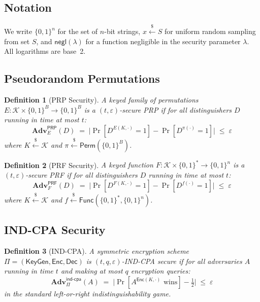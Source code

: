 \documentclass[11pt]{article}
\newtheorem{definition}{Definition}
\newcommand{\Enc}{\textsf{Enc}}
\newcommand{\Dec}{\textsf{Dec}}
\newcommand{\KeyGen}{\textsf{KeyGen}}
\newcommand{\PRF}{\textsf{PRF}}
\newcommand{\PRP}{\textsf{PRP}}
\newcommand{\Adv}{\mathbf{Adv}}
\newcommand{\negl}{\textsf{negl}}
\newcommand{\getsr}{\stackrel{\$}{\leftarrow}}
\begin{document}
\subsection{Notation}

We write $\{0,1\}^n$ for the set of $n$-bit strings, $x \getsr S$ for
uniform random sampling from set $S$, and $\negl(\lambda)$ for a function
negligible in the security parameter $\lambda$. All logarithms are base~2.

\subsection{Pseudorandom Permutations}

\begin{definition}[PRP Security]
\label{def:prp}
A keyed family of permutations $E: \mathcal{K} \times \{0,1\}^B \to \{0,1\}^B$
is a \emph{$(t, \varepsilon)$-secure PRP} if for all distinguishers $D$
running in time at most $t$:
\[
\Adv^{\PRP}_E(D) \;=\; \bigl|\Pr[D^{E(K,\cdot)} = 1] - \Pr[D^{\pi(\cdot)} = 1]\bigr| \;\leq\; \varepsilon
\]
where $K \getsr \mathcal{K}$ and $\pi \getsr \textsf{Perm}(\{0,1\}^B)$.
\end{definition}

\begin{definition}[PRF Security]
\label{def:prf}
A keyed function $F: \mathcal{K} \times \{0,1\}^* \to \{0,1\}^n$ is a
\emph{$(t, \varepsilon)$-secure PRF} if for all distinguishers $D$
running in time at most $t$:
\[
\Adv^{\PRF}_F(D) \;=\; \bigl|\Pr[D^{F(K,\cdot)} = 1] - \Pr[D^{f(\cdot)} = 1]\bigr| \;\leq\; \varepsilon
\]
where $K \getsr \mathcal{K}$ and $f \getsr \textsf{Func}(\{0,1\}^*, \{0,1\}^n)$.
\end{definition}

\subsection{IND-CPA Security}

\begin{definition}[IND-CPA]
\label{def:indcpa}
A symmetric encryption scheme $\Pi = (\KeyGen, \Enc, \Dec)$ is
\emph{$(t, q, \varepsilon)$-IND-CPA secure} if for all adversaries $A$
running in time $t$ and making at most $q$ encryption queries:
\[
\Adv^{\textsf{ind-cpa}}_\Pi(A) \;=\; \bigl|\Pr[A^{\Enc(K,\cdot)} \text{ wins}] - \tfrac{1}{2}\bigr| \;\leq\; \varepsilon
\]
in the standard left-or-right indistinguishability game.
\end{definition}
\end{document}
